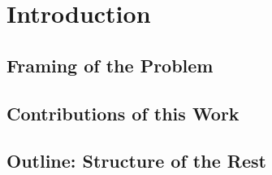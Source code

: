 
\chapter{Introduction}


\section{Framing of the Problem}

\section{Contributions of this Work}
\section{Outline: Structure of the Rest}

